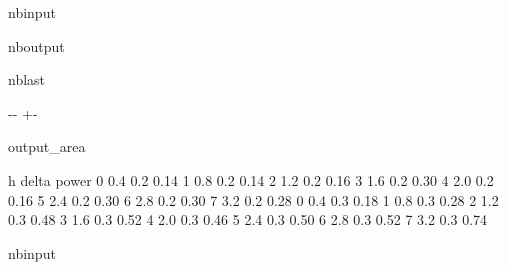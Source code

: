 \documentclass[letterpaper,10pt,english,openany,oneside]{sphinxmanual}
\begin{document}
\begin{sphinxuseclass}{nbinput}
{
\begin{sphinxVerbatim}[commandchars=\\\{\}]
\llap{\color{nbsphinxin}[18]:\,\hspace{\fboxrule}\hspace{\fboxsep}}
\end{sphinxVerbatim}
}

\end{sphinxuseclass}
\begin{sphinxuseclass}{nboutput}
\begin{sphinxuseclass}{nblast}
{

\kern-\sphinxverbatimsmallskipamount\kern-\baselineskip
\kern+\FrameHeightAdjust\kern-\fboxrule
\vspace{\nbsphinxcodecellspacing}

\begin{sphinxuseclass}{output_area}
\begin{sphinxuseclass}{}


\begin{sphinxVerbatim}[commandchars=\\\{\}]
\llap{\color{nbsphinxout}[18]:\,\hspace{\fboxrule}\hspace{\fboxsep}}     h  delta  power
0  0.4    0.2   0.14
1  0.8    0.2   0.14
2  1.2    0.2   0.16
3  1.6    0.2   0.30
4  2.0    0.2   0.16
5  2.4    0.2   0.30
6  2.8    0.2   0.30
7  3.2    0.2   0.28
0  0.4    0.3   0.18
1  0.8    0.3   0.28
2  1.2    0.3   0.48
3  1.6    0.3   0.52
4  2.0    0.3   0.46
5  2.4    0.3   0.50
6  2.8    0.3   0.52
7  3.2    0.3   0.74
\end{sphinxVerbatim}



\end{sphinxuseclass}
\end{sphinxuseclass}
}

\end{sphinxuseclass}
\end{sphinxuseclass}
\begin{sphinxuseclass}{nbinput}
{
\begin{sphinxVerbatim}[commandchars=\\\{\}]
\llap{\color{nbsphinxin}[19]:\,\hspace{\fboxrule}\hspace{\fboxsep}}
\end{sphinxVerbatim}
}

\end{sphinxuseclass}
\end{document}

